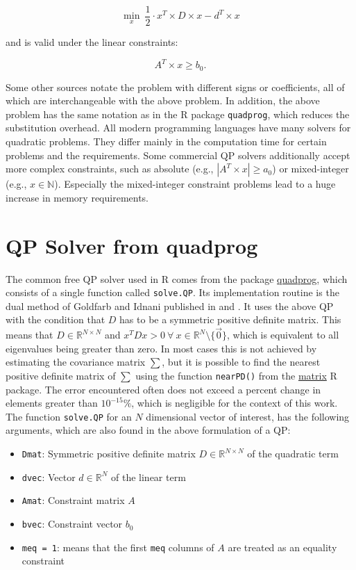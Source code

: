 \documentclass[
  oneside, a4paper, 12pt, openany]{book}
\providecommand{\tightlist}{%
  \setlength{\itemsep}{0pt}\setlength{\parskip}{0pt}}
\theoremstyle{definition}
\theoremstyle{definition}
\theoremstyle{definition}
\theoremstyle{definition}
\theoremstyle{remark}
\begin{document}
\[
  \min\limits_{x} \ \frac{1}{2} \cdot x^T \times D \times x - d^T \times x 
\]

and is valid under the linear constraints:

\[
  A^T \times x \geq b_0.
\]

Some other sources notate the problem with different signs or coefficients, all of which are interchangeable with the above problem. In addition, the above problem has the same notation as in the R package \texttt{quadprog}, which reduces the substitution overhead. All modern programming languages have many solvers for quadratic problems. They differ mainly in the computation time for certain problems and the requirements. Some commercial QP solvers additionally accept more complex constraints, such as absolute (e.g., \(|A^T \times x| \geq a_0\)) or mixed-integer (e.g., \(x \in \mathbb{N}\)). Especially the mixed-integer constraint problems lead to a huge increase in memory requirements.

\hypertarget{qp-solver-from-quadprog}{%
\section{QP Solver from quadprog}\label{qp-solver-from-quadprog}}

The common free QP solver used in R comes from the package \href{https://cran.r-project.org/web/packages/quadprog/quadprog.pdf}{quadprog}, which consists of a single function called \texttt{solve.QP}. Its implementation routine is the dual method of Goldfarb and Idnani published in \citep{GoId1982} and \citep{GoId1983}. It uses the above QP with the condition that \(D\) has to be a symmetric positive definite matrix. This means that \(D\in \mathbb{R}^{N \times N}\) and \(x^T D x > 0 \ \forall \ x \in \mathbb{R}^N \setminus \{\vec{0}\}\), which is equivalent to all eigenvalues being greater than zero. In most cases this is not achieved by estimating the covariance matrix \(\sum\), but it is possible to find the nearest positive definite matrix of \(\textstyle\sum\) using the function \texttt{nearPD()} from the \href{https://cran.r-project.org/web/packages/Matrix/Matrix.pdf}{matrix} R package. The error encountered often does not exceed a percent change in elements greater than \(10^{-15} \%\), which is negligible for the context of this work. The function \texttt{solve.QP} for an \(N\) dimensional vector of interest, has the following arguments, which are also found in the above formulation of a QP:

\begin{itemize}
\tightlist
\item
  \texttt{Dmat}: Symmetric positive definite matrix \(D \in \mathbb{R}^{N \times N}\) of the quadratic term
\item
  \texttt{dvec}: Vector \(d \in \mathbb{R}^{N}\) of the linear term
\item
  \texttt{Amat}: Constraint matrix \(A\)
\item
  \texttt{bvec}: Constraint vector \(b_0\)
\item
  \texttt{meq\ =\ 1}: means that the first \texttt{meq} columns of \(A\) are treated as an equality constraint
\end{itemize}
\end{document}
